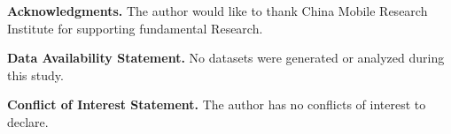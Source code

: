 \documentclass[12pt]{article}
\theoremstyle{plain}
\theoremstyle{definition}
\theoremstyle{remark}
\begin{document}













\vspace{1cm}
\noindent
\textbf{Acknowledgments.} The author would like to thank China Mobile Research Institute for supporting fundamental Research. 

\vspace{0.5cm}
\noindent
\textbf{Data Availability Statement.} No datasets were generated or analyzed during this study.

\vspace{0.5cm}
\noindent
\textbf{Conflict of Interest Statement.} The author has no conflicts of interest to declare.

\end{document}
